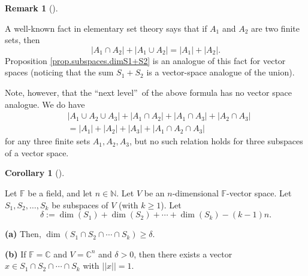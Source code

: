\documentclass[numbers=enddot,12pt,final,onecolumn,notitlepage]{scrartcl}%
\numberwithin{exer}{subsection}
\theoremstyle{definition}
\newtheorem{remk}[theo]{Remark}
\newenvironment{remark}[1][]
{\begin{remk}[#1]\begin{leftbar}}
{\end{leftbar}\end{remk}}
\newtheorem{coro}[theo]{Corollary}
\newenvironment{corollary}[1][]
{\begin{coro}[#1]\begin{leftbar}}
{\end{leftbar}\end{coro}}
\begin{document}
\begin{remark}
A well-known fact in elementary set theory says that if $A_{1}$ and $A_{2}$
are two finite sets, then%
\[
\left\vert A_{1}\cap A_{2}\right\vert +\left\vert A_{1}\cup A_{2}\right\vert
=\left\vert A_{1}\right\vert +\left\vert A_{2}\right\vert .
\]
Proposition \ref{prop.subspaces.dimS1+S2} is an analogue of this fact for
vector spaces (noticing that the sum $S_{1}+S_{2}$ is a vector-space analogue
of the union).

Note, however, that the \textquotedblleft next level\textquotedblright\ of the
above formula has no vector space analogue. We do have%
\begin{align*}
&  \left\vert A_{1}\cup A_{2}\cup A_{3}\right\vert +\left\vert A_{1}\cap
A_{2}\right\vert +\left\vert A_{1}\cap A_{3}\right\vert +\left\vert A_{2}\cap
A_{3}\right\vert \\
&  =\left\vert A_{1}\right\vert +\left\vert A_{2}\right\vert +\left\vert
A_{3}\right\vert +\left\vert A_{1}\cap A_{2}\cap A_{3}\right\vert
\end{align*}
for any three finite sets $A_{1},A_{2},A_{3}$, but no such relation holds for
three subspaces of a vector space.
\end{remark}

\begin{corollary}
\label{cor.subspaces.dim-geq-del}Let $\mathbb{F}$ be a field, and let
$n\in\mathbb{N}$. Let $V$ be an $n$-dimensional $\mathbb{F}$-vector space. Let
$S_{1},S_{2},\ldots,S_{k}$ be subspaces of $V$ (with $k\geq1$). Let
\[
\delta:=\dim\left(  S_{1}\right)  +\dim\left(  S_{2}\right)  +\cdots
+\dim\left(  S_{k}\right)  -\left(  k-1\right)  n.
\]


\textbf{(a)} Then, $\dim\left(  S_{1}\cap S_{2}\cap\cdots\cap S_{k}\right)
\geq\delta$. \medskip

\textbf{(b)} If $\mathbb{F}=\mathbb{C}$ and $V=\mathbb{C}^{n}$ and $\delta>0$,
then there exists a vector $x\in S_{1}\cap S_{2}\cap\cdots\cap S_{k}$ with
$\left\vert \left\vert x\right\vert \right\vert =1$.
\end{corollary}
\end{document}
